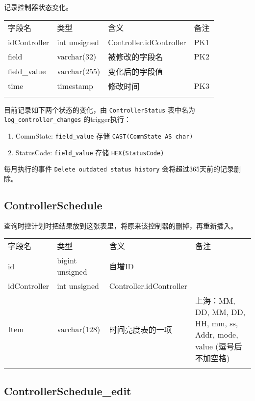 记录控制器状态变化。

\begin{longtabu}[c]{@{}lXXX@{}}
\toprule\addlinespace
字段名 & 类型 & 含义 & 备注
\\\addlinespace
\midrule\endhead
idController & int unsigned & Controller.idController & PK1
\\\addlinespace
field & varchar(32) & 被修改的字段名 & PK2
\\\addlinespace
field\_value & varchar(255) & 变化后的字段值
\\\addlinespace
time & timestamp & 修改时间 & PK3
\\\addlinespace
\bottomrule
\end{longtabu}

目前记录如下两个状态的变化，由 \texttt{ControllerStatus} 表中名为
\texttt{log\_controller\_changes} 的trigger执行：

\begin{enumerate}
\def\labelenumi{\arabic{enumi}.}
\itemsep1pt\parskip0pt
\item
  CommState: \texttt{field\_value} 存储 \texttt{CAST(CommState AS char)}
\item
  StatusCode: \texttt{field\_value} 存储 \texttt{HEX(StatusCode)}
\end{enumerate}

每月执行的事件 \texttt{Delete outdated status history}
会将超过365天前的记录删除。

\subsection{ControllerSchedule}\label{controllerschedule}

查询时控计划时把结果放到这张表里，将原来该控制器的删掉，再重新插入。

\begin{longtabu}[c]{@{}lXXX@{}}
\toprule\addlinespace
字段名 & 类型 & 含义 & 备注
\\\addlinespace
\midrule\endhead
id & bigint unsigned & 自增ID &
\\\addlinespace
idController & int unsigned & Controller.idController &
\\\addlinespace
Item & varchar(128) & 时间亮度表的一项 & 上海：MM, DD, MM, DD, HH, mm,
ss, Addr, mode, value (逗号后不加空格)
\\\addlinespace
\bottomrule
\end{longtabu}

\subsection{ControllerSchedule\_edit}\label{controllerscheduleux5fedit}


